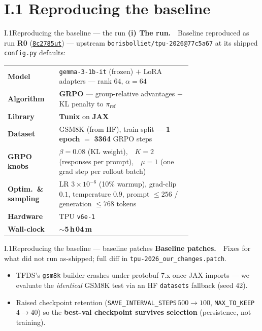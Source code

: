 \documentclass[aspectratio=169,11pt]{beamer}
\newcommand{\currsec}{}
\newcommand{\mysec}[1]{\gdef\currsec{#1}\section{#1}}
\newcommand{\code}[1]{\texttt{\small #1}}
\newcommand{\pref}{\pi_{\mathrm{ref}}}
\newcommand{\run}[1]{\textbf{#1}}
\newcommand{\wb}[1]{\href{https://wandb.ai/sichengma0514-university-of-cambridge/a8-grpo/runs/#1}{\texttt{\small #1}}}
\begin{document}
\mysec{I.1  Reproducing the baseline}
\begin{frame}{I.1\quad Reproducing the baseline --- the run}
\textbf{(i) The run.}\ \ Baseline reproduced as run \run{R0} (\wb{8c2785ut}) --- upstream \code{borisbolliet/tpu-2026@77c5a67} at its shipped \code{config.py} defaults:
\vspace{6pt}

\begin{center}\small
\renewcommand{\arraystretch}{1.25}
\begin{tabular}{@{}>{\bfseries}l@{\quad}>{\raggedright\arraybackslash}p{0.72\linewidth}@{}}
\toprule
Model & \code{gemma-3-1b-it} (frozen) $+$ LoRA adapters --- rank $64$, $\alpha{=}64$ \\
Algorithm & \textbf{GRPO} --- group-relative advantages $+$ KL penalty to $\pref$ \\
Library & \textbf{Tunix} on \textbf{JAX} \\
Dataset & GSM8K (from HF), train split --- \textbf{1 epoch} $=$ \textbf{3364} GRPO steps \\
GRPO knobs & $\beta{=}0.08$ (KL weight),\ \ $K{=}2$ (responses per prompt),\ \ $\mu{=}1$ (one grad step per rollout batch) \\
Optim.\ \& sampling & LR $3{\times}10^{-6}$ (10\% warmup), grad-clip $0.1$, temperature $0.9$, prompt $\leq256$ / generation $\leq768$ tokens \\
Hardware & TPU \code{v6e-1} \\
Wall-clock & $\sim$\textbf{5\,h\,04\,m} \\
\bottomrule
\end{tabular}
\end{center}
\end{frame}

\begin{frame}{I.1\quad Reproducing the baseline --- baseline patches}
\textbf{Baseline patches.}\ \ Fixes for what did not run as-shipped; full diff in \code{tpu-2026\_our\_changes.patch}.
\vfill
\begin{itemize}\setlength{\itemsep}{16pt}
  \item TFDS's \code{gsm8k} builder crashes under protobuf 7.x once JAX imports --- we evaluate the \emph{identical} GSM8K test via an HF \code{datasets} fallback (seed 42).
  \item Raised checkpoint retention (\code{SAVE\_INTERVAL\_STEPS}\,$500{\to}100$, \code{MAX\_TO\_KEEP}\,$4{\to}40$) so the \textbf{best-val checkpoint survives selection} (persistence, not training).
\end{itemize}
\vfill
\end{frame}
\end{document}
